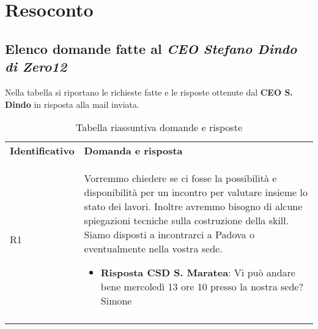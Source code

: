 \clearpage
\section{Resoconto}
	\subsection{Elenco domande fatte al \emph{CEO Stefano Dindo di Zero12}}
	Nella tabella si riportano le richieste fatte e le risposte ottenute dal \textbf{CEO S. Dindo} in risposta alla mail inviata.
		\begin{center}
			\renewcommand{\arraystretch}{1.5}
			\begin{longtable}{  p{2.5cm} p{11.7cm} }
				\rowcolor{tableHeadYellow}
				\textbf{Identificativo}&\textbf{Domanda e risposta}\\
				R1 & Vorremmo chiedere se ci fosse la possibilità e disponibilità per un incontro per valutare insieme lo stato dei lavori.
				Inoltre avremmo bisogno di alcune spiegazioni tecniche sulla costruzione della skill.
				Siamo disposti a incontrarci a Padova o eventualmente nella vostra sede.
				\begin{itemize}
					\item \textbf{Risposta CSD S. Maratea}: Vi può andare bene mercoledì 13 ore 10 presso la nostra sede?
					Simone
				\end{itemize}
				\\
				\rowcolor{white}
				\caption{Tabella riassuntiva domande e risposte}
			\end{longtable}	
		\end{center}
